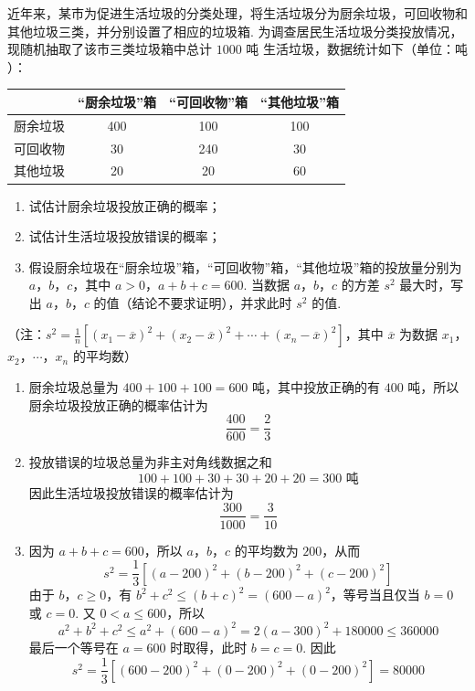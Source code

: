 \begin{problem}
近年来，某市为促进生活垃圾的分类处理，将生活垃圾分为厨余垃圾，可回收物和其他垃圾三类，并分别设置了相应的垃圾箱. 为调查居民生活垃圾分类投放情况，现随机抽取了该市三类垃圾箱中总计 \(1000\text{ 吨}\) 生活垃圾，数据统计如下（单位：\(\text{吨}\)）：

\begin{center}
\renewcommand{\arraystretch}{1.2}
\begin{tabular}{|c|c|c|c|}
\hline
& “厨余垃圾”箱 & “可回收物”箱 & “其他垃圾”箱 \\
\hline
厨余垃圾 & 400 & 100 & 100 \\
\hline
可回收物 & 30 & 240 & 30 \\
\hline
其他垃圾 & 20 & 20 & 60 \\
\hline
\end{tabular}
\end{center}

\begin{enumerate}
\item 试估计厨余垃圾投放正确的概率；
\item 试估计生活垃圾投放错误的概率；
\item 假设厨余垃圾在“厨余垃圾”箱，“可回收物”箱，“其他垃圾”箱的投放量分别为 \(a\)，\(b\)，\(c\)，其中 \(a>0\)，\(a+b+c=600\). 当数据 \(a\)，\(b\)，\(c\) 的方差 \(s^2\) 最大时，写出 \(a\)，\(b\)，\(c\) 的值（结论不要求证明），并求此时 \(s^2\) 的值.
\end{enumerate}

（注：\(s^2=\frac{1}{n}\left[(x_1-\overline{x})^2+(x_2-\overline{x})^2+\cdots+(x_n-\overline{x})^2\right]\)，其中 \(\overline{x}\) 为数据 \(x_1\)，\(x_2\)，\(\cdots\)，\(x_n\) 的平均数）
\end{problem}

\begin{solution}
\begin{enumerate}
\item 厨余垃圾总量为 \(400+100+100=600\) 吨，其中投放正确的有 \(400\) 吨，所以厨余垃圾投放正确的概率估计为
\[
\frac{400}{600}=\frac{2}{3}
\]
\item 投放错误的垃圾总量为非主对角线数据之和
\[
100+100+30+30+20+20=300\text{ 吨}
\]
因此生活垃圾投放错误的概率估计为
\[
\frac{300}{1000}=\frac{3}{10}
\]
\item 因为 \(a+b+c=600\)，所以 \(a\)，\(b\)，\(c\) 的平均数为 \(200\)，从而
\[
s^2=\frac13\left[(a-200)^2+(b-200)^2+(c-200)^2\right]
\]
由于 \(b\)，\(c\geqslant0\)，有 \(b^2+c^2\leqslant(b+c)^2=(600-a)^2\)，等号当且仅当 \(b=0\) 或 \(c=0\). 又 \(0<a\leqslant600\)，所以
\[
a^2+b^2+c^2\leqslant a^2+(600-a)^2=2(a-300)^2+180000\leqslant360000
\]
最后一个等号在 \(a=600\) 时取得，此时 \(b=c=0\). 因此
\[
s^2=\frac13\left[(600-200)^2+(0-200)^2+(0-200)^2\right]=80000
\]
\end{enumerate}
\end{solution}

